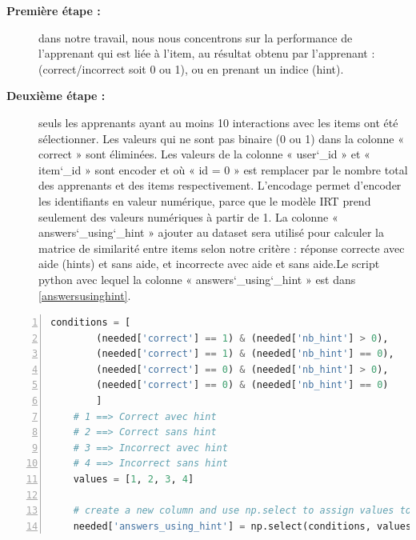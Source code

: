 \begin{description}
    \item[\textbf{Première étape : }] dans notre travail, nous nous concentrons sur la performance de l'apprenant qui est liée à l'item, au résultat obtenu par l'apprenant : (correct/incorrect soit 0 ou 1), ou en prenant un indice (hint).
    \item[\textbf{Deuxième étape : }] seuls les apprenants ayant au moins 10 interactions avec les items ont été sélectionner. Les valeurs qui ne sont pas binaire (0 ou 1) dans la colonne « correct » sont éliminées. Les valeurs de la colonne « user\char`_id »  et « item\char`_id » sont encoder et où « id = 0 » est remplacer par le nombre total des apprenants et des items respectivement. L’encodage permet d’encoder les identifiants en valeur numérique, parce que le modèle IRT prend seulement des valeurs numériques à partir de 1. La colonne « answers\char`_using\char`_hint » ajouter au dataset sera utilisé pour calculer la matrice de similarité entre items selon notre critère : réponse correcte avec aide (hints) et sans aide, et incorrecte avec aide et sans aide.Le script python avec lequel la colonne « answers\char`_using\char`_hint » est dans \ref{answersusinghint}.
\end{description}

\newpage
\begin{lstlisting}[language=Python,label={answersusinghint}, 
	morekeywords={self},
	keywordstyle=\ttb\color{deepblue},
	emph={MyClass,__init__},
	emphstyle=\ttb\color{deepred},
	stringstyle=\color{deepgreen},basicstyle=\scriptsize, frame=l,framesep=4.5mm,framexleftmargin=2.5mm,tabsize=2,numbers=left,fillcolor=\color{blueforest!70},rulecolor=\color{blueforest},numberstyle=\normalfont\tiny\color{white}]
	conditions = [
		(needed['correct'] == 1) & (needed['nb_hint'] > 0),
		(needed['correct'] == 1) & (needed['nb_hint'] == 0),
		(needed['correct'] == 0) & (needed['nb_hint'] > 0),
		(needed['correct'] == 0) & (needed['nb_hint'] == 0)
		]
	# 1 ==> Correct avec hint
	# 2 ==> Correct sans hint
	# 3 ==> Incorrect avec hint
	# 4 ==> Incorrect sans hint
	values = [1, 2, 3, 4]
	
	# create a new column and use np.select to assign values to it using our lists as arguments
	needed['answers_using_hint'] = np.select(conditions, values)
\end{lstlisting}

